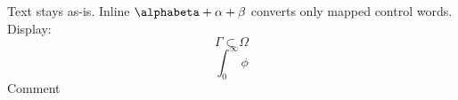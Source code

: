 \documentclass{article}
\begin{document}
Text \alpha stays as-is.
Inline $ \alphabeta + \alpha + \beta $ converts only mapped control words.
Display:
\[
\Gamma \subset \Omega
\]
\begin{equation}
\int_0^\infty \phi
\end{equation}
Comment %
\end{document}
